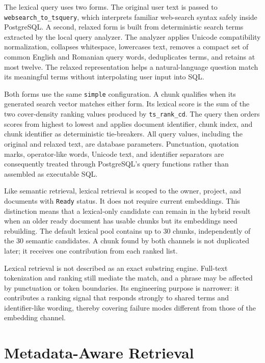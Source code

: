 The lexical query uses two forms. The original user text is passed to \texttt{websearch\_to\_tsquery}, which interprets familiar web-search syntax safely inside PostgreSQL. A second, relaxed form is built from deterministic search terms extracted by the local query analyzer. The analyzer applies Unicode compatibility normalization, collapses whitespace, lowercases text, removes a compact set of common English and Romanian query words, deduplicates terms, and retains at most twelve. The relaxed representation helps a natural-language question match its meaningful terms without interpolating user input into SQL.

Both forms use the same \texttt{simple} configuration. A chunk qualifies when its generated search vector matches either form. Its lexical score is the sum of the two cover-density ranking values produced by \texttt{ts\_rank\_cd}. The query then orders scores from highest to lowest and applies document identifier, chunk index, and chunk identifier as deterministic tie-breakers. All query values, including the original and relaxed text, are database parameters. Punctuation, quotation marks, operator-like words, Unicode text, and identifier separators are consequently treated through PostgreSQL's query functions rather than assembled as executable SQL.

Like semantic retrieval, lexical retrieval is scoped to the owner, project, and documents with \texttt{Ready} status. It does not require current embeddings. This distinction means that a lexical-only candidate can remain in the hybrid result when an older ready document has usable chunks but its embeddings need rebuilding. The default lexical pool contains up to 30 chunks, independently of the 30 semantic candidates. A chunk found by both channels is not duplicated later; it receives one contribution from each ranked list.

Lexical retrieval is not described as an exact substring engine. Full-text tokenization and ranking still mediate the match, and a phrase may be affected by punctuation or token boundaries. Its engineering purpose is narrower: it contributes a ranking signal that responds strongly to shared terms and identifier-like wording, thereby covering failure modes different from those of the embedding channel.

\section{Metadata-Aware Retrieval}
\label{sec:metadata-aware-retrieval}

